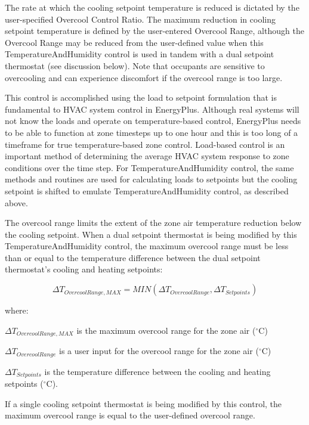 The rate at which the cooling setpoint temperature is reduced is dictated by the user-specified Overcool Control Ratio. The maximum reduction in cooling setpoint temperature is defined by the user-entered Overcool Range, although the Overcool Range may be reduced from the user-defined value when this TemperatureAndHumidity control is used in tandem with a dual setpoint thermostat (see discussion below). Note that occupants are sensitive to overcooling and can experience discomfort if the overcool range is too large.

This control is accomplished using the load to setpoint formulation that is fundamental to HVAC system control in EnergyPlus. Although real systems will not know the loads and operate on temperature-based control, EnergyPlus needs to be able to function at zone timesteps up to one hour and this is too long of a timeframe for true temperature-based zone control. Load-based control is an important method of determining the average HVAC system response to zone conditions over the time step. For TemperatureAndHumidity control, the same methods and routines are used for calculating loads to setpoints but the cooling setpoint is shifted to emulate TemperatureAndHumidity control, as described above.

The overcool range limits the extent of the zone air temperature reduction below the cooling setpoint. When a dual setpoint thermostat is being modified by this TemperatureAndHumidity control, the maximum overcool range must be less than or equal to the temperature difference between the dual setpoint thermostat's cooling and heating setpoints:

\begin{equation}
\Delta {T_{OvercoolRange,MAX}} = MIN \left( {\Delta {T_{OvercoolRange}},\Delta {T_{Setpoints}}} \right)
\end{equation}

where:

\(\Delta {T_{OvercoolRange,MAX}}\) is the maximum overcool range for the zone air (\(^{\circ}\)C)

\(\Delta {T_{OvercoolRange}}\) is a user input for the overcool range for the zone air (\(^{\circ}\)C)

\(\Delta {T_{Setpoints}}\) is the temperature difference between the cooling and heating setpoints (\(^{\circ}\)C).

If a single cooling setpoint thermostat is being modified by this control, the maximum overcool range is equal to the user-defined overcool range.

